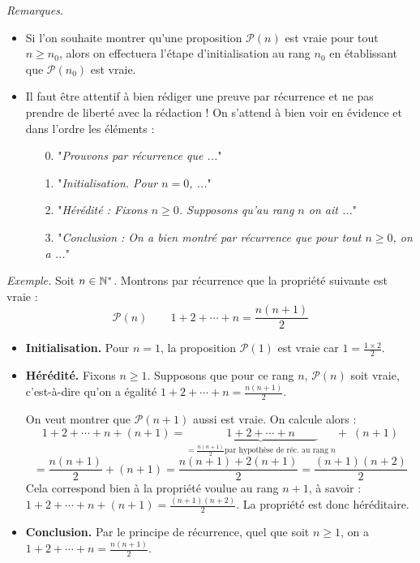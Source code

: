 \documentclass[11pt,class=report,crop=false]{standalone}
\begin{document}
\emph{Remarques.}   
\begin{itemize}
    \item Si l'on souhaite montrer qu'une proposition $\mathcal{P}(n)$ est vraie pour tout $n \geq n_0$, alors on effectuera l'étape d'initialisation au rang $n_0$ en établissant que $\mathcal{P}(n_0)$ est vraie.
    
    \item Il faut être attentif à bien rédiger une preuve par récurrence et ne pas prendre de liberté avec la rédaction ! On s'attend à bien voir en évidence et dans l'ordre les éléments :
    \begin{itemize} 
            \item[0.] "\emph{Prouvons par récurrence que ...}"
            \item[1.] "\emph{Initialisation. Pour $n=0$, ...}"
            \item[2.] "\emph{Hérédité : Fixons $n\ge0$. Supposons qu'au rang $n$ on ait ...}"
            \item[3.] "\emph{Conclusion : On a bien montré par récurrence que pour tout $n \ge 0$, on a ...}"
        \end{itemize}
\end{itemize}



\emph{Exemple.}
Soit $n\in\mathbb{N}^*$. Montrons par récurrence que la propriété suivante est vraie : 
$$\mathcal{P}(n) \qquad 1+2+\cdots+n =\frac{n(n+1)}{2}$$
\begin{itemize}
    \item \textbf{Initialisation.} 
    Pour $n=1$, la proposition $\mathcal{P}(1)$ est vraie car  $1 = \frac{1 \times 2}{2}$.
    
    \item \textbf{Hérédité.}
    Fixons $n\ge1$.
    Supposons que pour ce rang $n$, $\mathcal{P}(n)$ soit vraie, c'est-à-dire qu'on a égalité 
    $1+2+\cdots+n=\frac{n(n+1)}{2}$.
    
    On veut montrer que $\mathcal{P}(n+1)$ aussi est vraie.
    On calcule alors :
    $$1+2+\cdots+n + (n+1) = \underbrace{\qquad 1 + 2 + \cdots + n \qquad }_{= \frac{n(n+1)}{2} \text{par hypothèse de réc. au rang $n$}} + \; (n+1) $$ 
    $$ = \frac{n(n+1)}{2} + (n+1)= \frac{n(n+1) + 2(n+1)}{2}=\frac{(n+1)(n+2)}{2}$$
    Cela correspond bien à la propriété voulue au rang $n+1$, à savoir : $1+2+\cdots+n + (n+1) =\frac{(n+1)(n+2)}{2}$. La propriété est donc héréditaire.
    
    \item \textbf{Conclusion.} Par le principe de récurrence, quel que soit $n \ge 1$, on a $1+2+\cdots+n=\frac{n(n+1)}{2}$.
\end{itemize}
\end{document}
